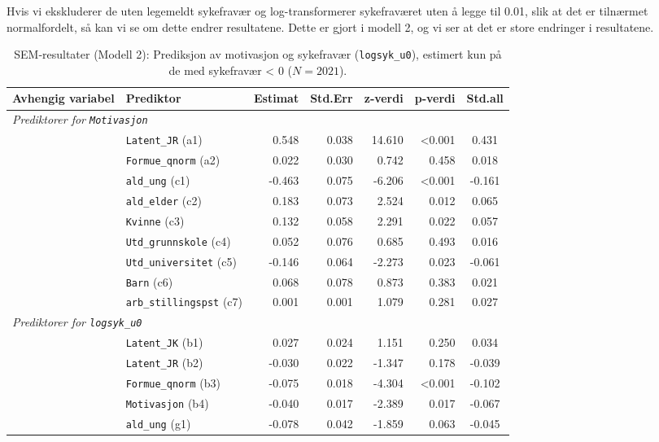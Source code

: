 \documentclass[
  12pt,
  a4paper,
  DIV=11,
  numbers=noendperiod]{scrartcl}
\begin{document}
Hvis vi ekskluderer de uten legemeldt sykefravær og log-transformerer
sykefraværet uten å legge til 0.01, slik at det er tilnærmet
normalfordelt, så kan vi se om dette endrer resultatene. Dette er gjort
i modell 2, og vi ser at det er store endringer i resultatene.

\begin{table}[htbp]
\centering
\caption{SEM‐resultater (Modell 2): Prediksjon av motivasjon og sykefravær (\texttt{logsyk\_u0}), estimert kun på de med sykefravær < 0 ($N = 2021$).}
\label{tab:sem_results_model2}
\begin{tabular}{@{}llrrrrc@{}}
\toprule
Avhengig variabel & Prediktor & Estimat & Std.Err & z‐verdi & p‐verdi & Std.all \\
\midrule
\multicolumn{7}{l}{\textit{Prediktorer for \texttt{Motivasjon}}} \\
& \texttt{Latent\_JR} (a1)        & 0.548 & 0.038 & 14.610 & <0.001 & 0.431 \\
& \texttt{Formue\_qnorm} (a2)     & 0.022 & 0.030 & 0.742  & 0.458  & 0.018 \\
& \texttt{ald\_ung} (c1)          & -0.463& 0.075 & -6.206 & <0.001 & -0.161 \\
& \texttt{ald\_elder} (c2)        & 0.183 & 0.073 & 2.524  & 0.012  & 0.065 \\
& \texttt{Kvinne} (c3)            & 0.132 & 0.058 & 2.291  & 0.022  & 0.057 \\
& \texttt{Utd\_grunnskole} (c4)   & 0.052 & 0.076 & 0.685  & 0.493  & 0.016 \\
& \texttt{Utd\_universitet} (c5)  & -0.146& 0.064 & -2.273 & 0.023  & -0.061 \\
& \texttt{Barn} (c6)              & 0.068 & 0.078 & 0.873  & 0.383  & 0.021 \\
& \texttt{arb\_stillingspst} (c7) & 0.001 & 0.001 & 1.079  & 0.281  & 0.027 \\
\midrule
\multicolumn{7}{l}{\textit{Prediktorer for \texttt{logsyk\_u0}}} \\
& \texttt{Latent\_JK} (b1)        & 0.027 & 0.024 & 1.151  & 0.250  & 0.034 \\
& \texttt{Latent\_JR} (b2)        & -0.030& 0.022 & -1.347 & 0.178  & -0.039 \\
& \texttt{Formue\_qnorm} (b3)     & -0.075& 0.018 & -4.304 & <0.001 & -0.102 \\
& \texttt{Motivasjon} (b4)        & -0.040& 0.017 & -2.389 & 0.017  & -0.067 \\
& \texttt{ald\_ung} (g1)          & -0.078& 0.042 & -1.859 & 0.063  & -0.045 \\

\end{tabular}
\end{table}
\end{document}
